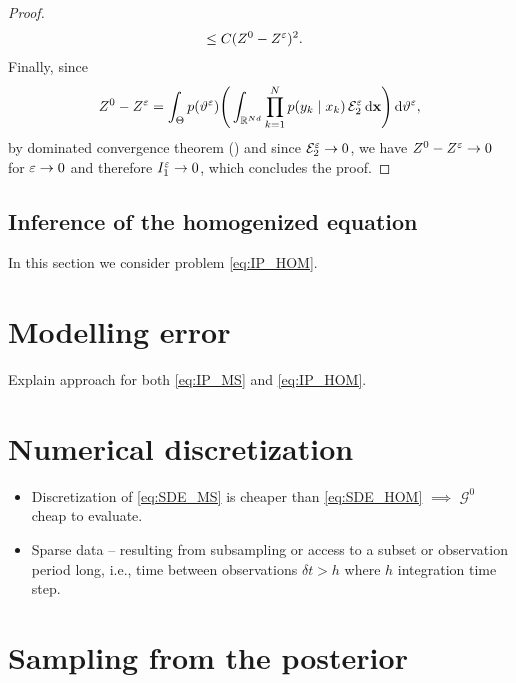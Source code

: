 \documentclass[10pt]{article}
\begin{document}
\begin{proof}
\begin{equation}
\begin{aligned}
		&\leq C(Z^0 - Z^\varepsilon)^2.
	\end{aligned}
	\end{equation}
	Finally, since
	\begin{equation}
		Z^0 - Z^\varepsilon = \int_{\Theta} p(\vartheta^\varepsilon) \Bigg(\int_{\mathbb{R}^{Nd}} \prod_{k=1}^N p(y_k \mid x_k) \, \mathcal E_2^\varepsilon \,\mathrm{d} \mathbf x \Bigg) \,\mathrm{d} \vartheta^\varepsilon,
	\end{equation}
	by dominated convergence theorem () and since $\mathcal E_2^\varepsilon \to 0$, we have $Z^0 - Z^\varepsilon \to 0$ for $\varepsilon \to 0$ and therefore $I_1^\varepsilon \to 0$, which concludes the proof.
\end{proof}

\subsection{Inference of the homogenized equation}

In this section we consider problem \eqref{eq:IP_HOM}.

\section{Modelling error}

Explain approach for both \eqref{eq:IP_MS} and \eqref{eq:IP_HOM}.

\section{Numerical discretization}

\begin{itemize}[label=-]
	\item Discretization of \eqref{eq:SDE_MS} is cheaper than \eqref{eq:SDE_HOM} $\implies$ $\mathcal G^0$ cheap to evaluate.
	\item Sparse data -- resulting from subsampling or access to a subset or observation period long, i.e., time between observations $\delta t > h$ where $h$ integration time step.
\end{itemize}

\section{Sampling from the posterior}
\end{document}
